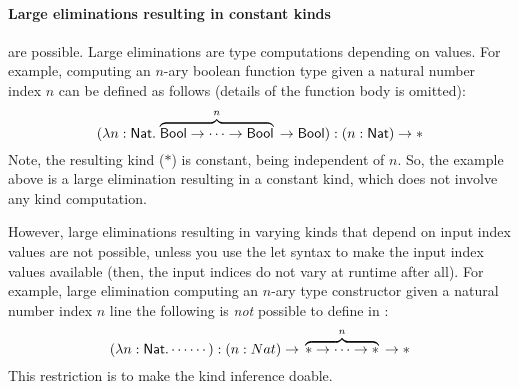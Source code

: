 \paragraph{Large eliminations resulting in constant kinds} are possible.
Large eliminations are type computations depending on values.  For example,
computing an $n$-ary boolean function type given a natural number index $n$
can be defined as follows (details of the function body is omitted):
\[
(\lambda n:\mathsf{Nat}. \stackrel{n}{\overbrace{\mathsf{Bool}-> \cdots-> \mathsf{Bool}}}\;\, -> \mathsf{Bool})
  : (n:\mathsf{Nat}) -> *
\]
Note, the resulting kind ($*$) is constant, being independent of $n$.
So, the example above is a large elimination resulting in a constant kind,
which does not involve any kind computation.

However, large eliminations resulting in varying kinds that depend on
input index values are not possible, unless you use the let syntax to make
the input index values available (then, the input indices do not vary
at runtime after all). For example, large elimination computing an $n$-ary
type constructor given a natural number index $n$ line the following
is \emph{not} possible to define in \Fi:
\[
(\lambda n:\mathsf{Nat}. \cdots \cdots)
  : (n:Nat) -> \,\;\stackrel{n}{\overbrace{* -> \cdots -> *}}\;\, -> *
\]
This restriction is to make the kind inference doable.

